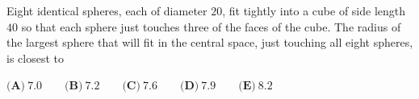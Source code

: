 Eight identical spheres, each of diameter $20$, fit tightly into a cube of side length $40$ so that each sphere just touches three of the faces of the cube. The radius of the largest sphere that will fit in the central space, just touching all eight spheres, is closest to

$\textbf{(A)}\ 7.0\qquad\textbf{(B)}\ 7.2\qquad\textbf{(C)}\ 7.6\qquad\textbf{(D)}\ 7.9\qquad\textbf{(E)}\ 8.2$
